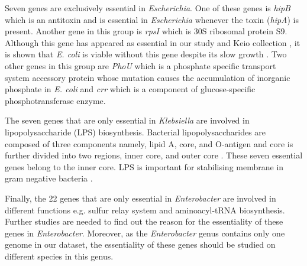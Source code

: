 \documentclass[12pt,letterpaper]{article}
\begin{document}
Seven genes are exclusively essential in \textit{Escherichia}. One of these genes is \textit{hipB} which is an antitoxin and is essential in \textit{Escherichia} whenever the toxin (\textit{hipA}) is present. Another gene in this group is \textit{rpsI} which is 30S ribosomal protein S9. Although this gene has appeared as essential in our study and Keio collection \cite{baba_construction_2006}, it is shown that \textit{E. coli} is viable without this gene despite its slow growth \cite{bubunenko_essentiality_2007, shoji_systematic_2011}. Two other genes in this group are \textit{PhoU} which is a phosphate specific transport system accessory protein whose mutation causes the accumulation of inorganic phosphate in \textit{E. coli} \cite{morohoshi_accumulation_2002} and \textit{crr} which is a component of glucose-specific phosphotransferase enzyme.

The seven genes that are only essential in \textit{Klebsiella} are involved in lipopolysaccharide (LPS) biosynthesis. Bacterial lipopolysaccharides are composed of three components namely, lipid A, core, and O-antigen and core is further divided into two regions, inner core, and outer core \cite{caroff_structure_2003}. These seven essential genes belong to the inner core. LPS is important for stabilising membrane in gram negative bacteria \cite{salton_structure_1996}.
 
Finally, the 22 genes that are only essential in \textit{Enterobacter} are involved in different functions e.g. sulfur relay system and aminoacyl-tRNA biosynthesis. Further studies are needed to find out the reason for the essentiality of these genes in \textit{Enterobacter}. Moreover, as the \textit{Enterobacter} genus contains only one genome in our dataset, the essentiality of these genes should be studied on different species in this genus.
\end{document}
